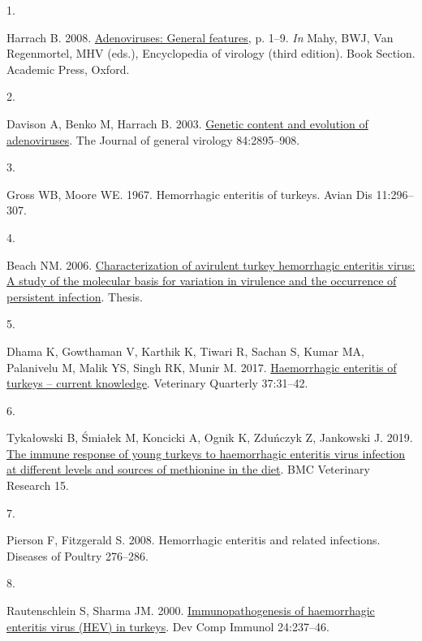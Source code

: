 \documentclass[
]{article}
\newlength{\cslhangindent}
\newlength{\csllabelwidth}
\newenvironment{CSLReferences}[2] %
 {\begin{list}{}{%
  \setlength{\itemindent}{0pt}
  \setlength{\leftmargin}{0pt}
  \setlength{\parsep}{0pt}
  \ifodd #1
   \setlength{\leftmargin}{\cslhangindent}
   \setlength{\itemindent}{-1\cslhangindent}
  \fi
  \setlength{\itemsep}{#2\baselineskip}}}
 {\end{list}}
\newcommand{\CSLLeftMargin}[1]{\parbox[t]{\csllabelwidth}{\strut#1\strut}}
\newcommand{\CSLRightInline}[1]{\parbox[t]{\linewidth - \csllabelwidth}{\strut#1\strut}}
\begin{document}
\setlength{\parindent}{-0.25in}
\setlength{\leftskip}{0.25in}

\noindent

\label{refs}
\begin{CSLReferences}{0}{1}
\CSLLeftMargin{1. }%
\CSLRightInline{Harrach B. 2008.
\href{https://doi.org/10.1016/B978-012374410-4.00680-4}{Adenoviruses:
General features}, p. 1--9. \emph{In} Mahy, BWJ, Van Regenmortel, MHV
(eds.), Encyclopedia of virology (third edition). Book Section. Academic
Press, Oxford.}

\CSLLeftMargin{2. }%
\CSLRightInline{Davison A, Benko M, Harrach B. 2003.
\href{https://doi.org/10.1099/vir.0.19497-0}{Genetic content and
evolution of adenoviruses}. The Journal of general virology
84:2895--908.}

\CSLLeftMargin{3. }%
\CSLRightInline{Gross WB, Moore WE. 1967. Hemorrhagic enteritis of
turkeys. Avian Dis 11:296--307.}

\CSLLeftMargin{4. }%
\CSLRightInline{Beach NM. 2006.
\href{http://scholar.lib.vt.edu/theses/available/etd-08142006-145339/}{Characterization
of avirulent turkey hemorrhagic enteritis virus: A study of the
molecular basis for variation in virulence and the occurrence of
persistent infection}. Thesis.}

\CSLLeftMargin{5. }%
\CSLRightInline{Dhama K, Gowthaman V, Karthik K, Tiwari R, Sachan S,
Kumar MA, Palanivelu M, Malik YS, Singh RK, Munir M. 2017.
\href{https://doi.org/10.1080/01652176.2016.1277281}{Haemorrhagic
enteritis of turkeys -- current knowledge}. Veterinary Quarterly
37:31--42.}

\CSLLeftMargin{6. }%
\CSLRightInline{Tykałowski B, Śmiałek M, Koncicki A, Ognik K, Zduńczyk
Z, Jankowski J. 2019.
\href{https://doi.org/10.1186/s12917-019-2138-8}{The immune response of
young turkeys to haemorrhagic enteritis virus infection at different
levels and sources of methionine in the diet}. BMC Veterinary Research
15.}

\CSLLeftMargin{7. }%
\CSLRightInline{Pierson F, Fitzgerald S. 2008. Hemorrhagic enteritis and
related infections. Diseases of Poultry 276--286.}

\CSLLeftMargin{8. }%
\CSLRightInline{Rautenschlein S, Sharma JM. 2000.
\href{https://doi.org/10.1016/s0145-305x(99)00075-0}{Immunopathogenesis
of haemorrhagic enteritis virus (HEV) in turkeys}. Dev Comp Immunol
24:237--46.}


\end{CSLReferences}
\end{document}
